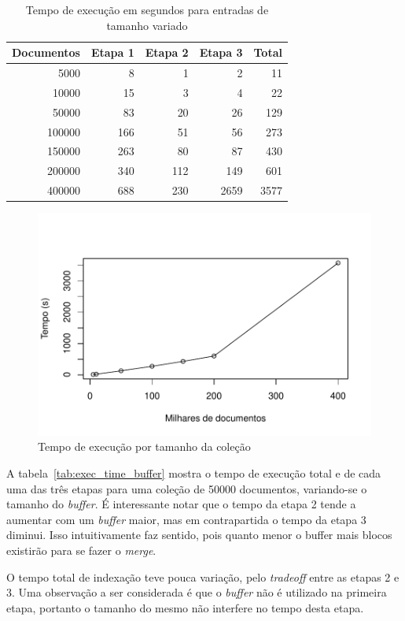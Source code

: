\documentclass[12pt]{article}
\begin{document}
\begin{table}[ht]
\centering
\caption{Tempo de execução em segundos para entradas de tamanho variado}
\label{tab:exec_time_collection}
\begin{tabular}{rrrrr}
Documentos  & Etapa 1 & Etapa 2 & Etapa 3 & Total \\ \hline
5000        & 8      & 1      & 2      & 11 \\
10000       & 15     & 3      & 4      & 22 \\
50000       & 83     & 20     & 26     & 129 \\
100000      & 166    & 51     & 56     & 273 \\
150000      & 263    & 80     & 87     & 430 \\
200000      & 340    & 112    & 149    & 601 \\
400000      & 688    & 230    & 2659   & 3577 \\
\end{tabular}
\end{table}


\begin{figure}[ht]
\centering
\includegraphics[width=.8\textwidth]{linechart.pdf}
\caption{Tempo de execução por tamanho da coleção}
\label{fig:time_vs_colsize}
\end{figure}


A tabela~\ref{tab:exec_time_buffer} mostra o tempo de execução total e de cada uma das três etapas para uma coleção de 50000 documentos, variando-se o tamanho do \emph{buffer}. É interessante notar que o tempo da etapa 2 tende a aumentar com um \emph{buffer} maior, mas em contrapartida o tempo da etapa 3 diminui. Isso intuitivamente faz sentido, pois quanto menor o buffer mais blocos existirão para se fazer o \emph{merge}.

O tempo total de indexação teve pouca variação, pelo \emph{tradeoff} entre as etapas 2 e 3. Uma observação a ser considerada é que o \emph{buffer} não é utilizado na primeira etapa, portanto o tamanho do mesmo não interfere no tempo desta etapa.
\end{document}
